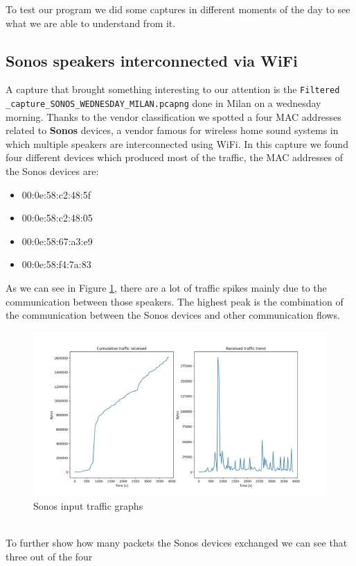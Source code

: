 To test our program we did some captures in different moments of the day to see what we are able to 
understand from it.


\subsection{Sonos speakers interconnected via WiFi}
 A capture that brought something interesting to our attention is the \texttt{Filtered
\_capture\_SONOS\_WEDNESDAY\_MILAN.pcapng} done in Milan on a wednesday morning. Thanks to the vendor 
classification we spotted a four MAC addresses related to \textbf{Sonos} devices, a vendor famous for
wireless home sound systems in which multiple speakers are interconnected using WiFi. In this capture 
we found four different devices which produced most of the traffic, the MAC addresses of the Sonos 
devices are:
\begin{itemize}
    \item 00:0e:58:c2:48:5f
    \item 00:0e:58:c2:48:05
    \item 00:0e:58:67:a3:e9
    \item 00:0e:58:f4:7a:83
\end{itemize}
As we can see in Figure \ref{fig:Sonos_traffic}, there are a lot of traffic spikes mainly due to the
communication between those speakers. The highest peak is the combination of the communication between
the Sonos devices and other communication flows.
\begin{figure}[h]
    \includegraphics[width=\textwidth]{Graphs/SONOS_cum_in_traffic.png}
    \caption{Sonos input traffic graphs}
    \label{fig:Sonos_traffic}
\end{figure}
\\
To further show how many packets the Sonos devices exchanged we can see that three out of the four
